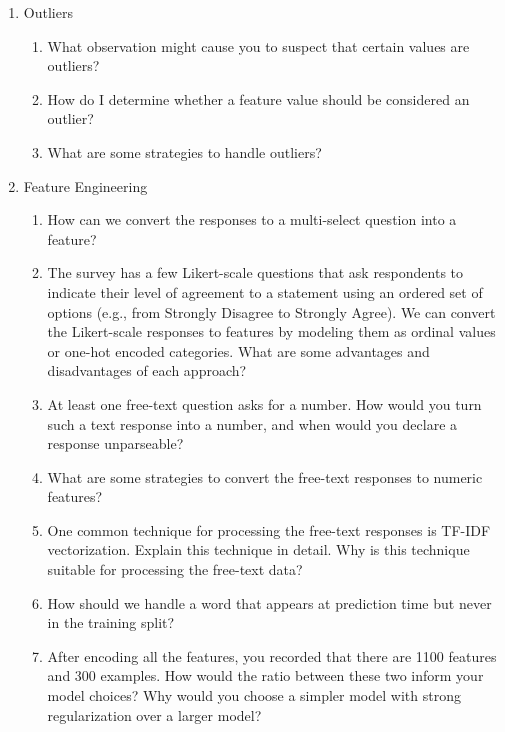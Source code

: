 \documentclass[12pt]{article}
\begin{document}
\begin{enumerate}
\begin{enumerate}
\item
Suppose that you decide to impute the median value for a numeric feature. Why is it
problematic to do the imputation on the validation and test sets?
\item Finally, decide how missing values should be handled for each feature in our
dataset, and record your decision.
\end{enumerate}
\item Outliers
\begin{enumerate}
\item What observation might cause you to suspect that certain values are outliers?
\item How do I determine whether a feature value should be considered an outlier?
\item What are some strategies to handle outliers?
\end{enumerate}
\item Feature Engineering
\begin{enumerate}
\item How can we convert the responses to a multi-select question into a feature?
\item The survey has a few Likert-scale questions that ask respondents to indicate
their level of agreement to a statement using an ordered set of options (e.g., from
Strongly Disagree to Strongly Agree). We can convert the Likert-scale responses to
features by modeling them as ordinal values or one-hot encoded categories. What are
some advantages and disadvantages of each approach?
\item At least one free-text question asks for a number. How would you turn such a
text response into a number, and when would you declare a response unparseable?
\item What are some strategies to convert the free-text responses to numeric
features?
\item One common technique for processing the free-text responses is TF-IDF
vectorization. Explain this technique in detail. Why is this technique suitable for
processing the free-text data?
\item How should we handle a word that appears at prediction time but never in the
training split?
\item After encoding all the features, you recorded that there are 1100 features
and 300 examples. How would the ratio between these two inform your model choices?
Why would you choose a simpler model with strong regularization over a larger
model?
\end{enumerate}

\end{enumerate}
\end{document}
